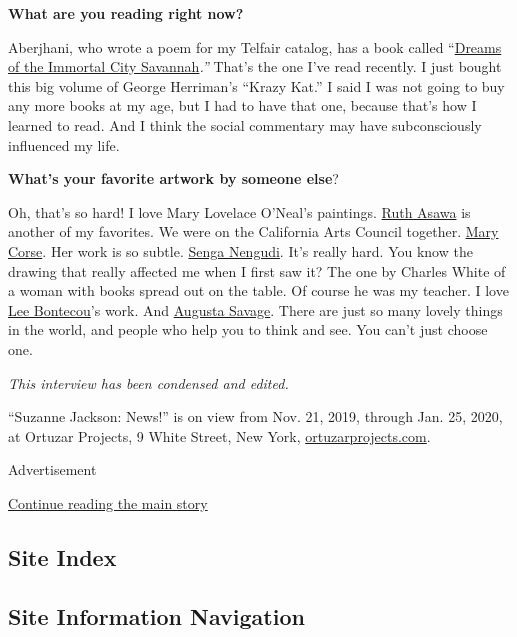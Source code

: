 \textbf{What are you reading right now?}

Aberjhani, who wrote a poem for my Telfair catalog, has a book called
``\href{https://www.author-poet-aberjhani.info/dreams-of-the-immortal-city-savannah}{Dreams
of the Immortal City Savannah}\emph{.''} That's the one I've read
recently. I just bought this big volume of George Herriman's ``Krazy
Kat.'' I said I was not going to buy any more books at my age, but I had
to have that one, because that's how I learned to read. And I think the
social commentary may have subconsciously influenced my life.

\textbf{What's your favorite artwork by someone else}?

Oh, that's so hard! I love Mary Lovelace O'Neal's paintings.
\href{https://www.nytimes3xbfgragh.onion/2013/08/18/arts/design/ruth-asawa-an-artist-who-wove-wire-dies-at-87.html}{Ruth
Asawa} is another of my favorites. We were on the California Arts
Council together.
\href{https://www.lehmannmaupin.com/artists/mary-corse}{Mary Corse}. Her
work is so subtle. \href{http://sengasenga.com/}{Senga Nengudi}. It's
really hard. You know the drawing that really affected me when I first
saw it? The one by Charles White of a woman with books spread out on the
table. Of course he was my teacher. I love
\href{https://www.moma.org/artists/670}{Lee Bontecou}'s work. And
\href{https://americanart.si.edu/artist/augusta-savage-4269}{Augusta
Savage}. There are just so many lovely things in the world, and people
who help you to think and see. You can't just choose one.

\emph{This interview has been condensed and edited.}

``Suzanne Jackson: News!'' is on view from Nov. 21, 2019, through Jan.
25, 2020, at Ortuzar Projects, 9 White Street, New York,
\href{http://www.ortuzarprojects.com/exhibitions/suzanne-jackson}{ortuzarprojects.com}.

Advertisement

\protect\hyperlink{after-bottom}{Continue reading the main story}

\hypertarget{site-index}{%
\subsection{Site Index}\label{site-index}}

\hypertarget{site-information-navigation}{%
\subsection{Site Information
Navigation}\label{site-information-navigation}}

